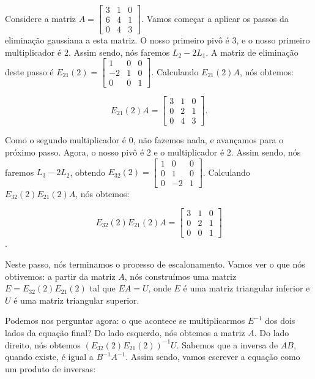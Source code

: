 \begin{Example}
	Considere a matriz $A = \begin{bmatrix}
		3 & 1 & 0 \\
		6 & 4 & 1 \\
		0 & 4 & 3
	\end{bmatrix}$. Vamos começar a aplicar os passos da eliminação gaussiana a esta matriz. O nosso primeiro pivô é $3$, e o nosso primeiro multiplicador é $2$. Assim sendo, nós faremos $L_2 - 2L_1$. A matriz de eliminação deste passo é $E_{21}(2) = \begin{bmatrix}
		1 & 0 & 0 \\
		-2 & 1 & 0 \\
		0 & 0 & 1
	\end{bmatrix}$. Calculando $E_{21}(2)A$, nós obtemos:
	
	$$
	E_{21}(2)A = \begin{bmatrix}
		3 & 1 & 0 \\
		0 & 2 & 1 \\
		0 & 4 & 3
	\end{bmatrix}.
	$$
	
	Como o segundo multiplicador é $0$, não fazemos nada, e avançamos para o próximo passo. Agora, o nosso pivô é $2$ e o multiplicador é $2$. Assim sendo, nós faremos $L_3 - 2L_2$, obtendo $E_{32}(2) = \begin{bmatrix}
		1 & 0 & 0 \\
		0 & 1 & 0 \\
		0 & -2 & 1
	\end{bmatrix}$. Calculando $E_{32}(2)E_{21}(2)A$, nós obtemos:
	
	$$
	E_{32}(2)E_{21}(2)A = \begin{bmatrix}
		3 & 1 & 0 \\
		0 & 2 & 1 \\
		0 & 0 & 1
	\end{bmatrix}
	$$. 
	
	Neste passo, nós terminamos o processo de escalonamento. Vamos ver o que nós obtivemos: a partir da matriz $A$, nós construímos uma matriz $E = E_{32}(2)E_{21}(2)$ tal que $EA = U$, onde $E$ é uma matriz triangular inferior e $U$ é uma matriz triangular superior.
	
	Podemos nos perguntar agora: o que acontece se multiplicarmos $E^{-1}$ dos dois lados da equação final? Do lado esquerdo, nós obtemos a matriz $A$. Do lado direito, nós obtemos $(E_{32}(2)E_{21}(2))^{-1}U$. Sabemos que a inversa de $AB$, quando existe, é igual a $B^{-1}A^{-1}$. Assim sendo, vamos escrever a equação como um produto de inversas:
	

\end{Example}
